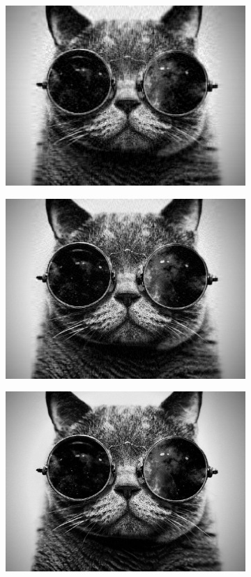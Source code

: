 \begin{figure}[h!]
\vspace{0.4cm}
\begin{subfigure}[c]{.3\textwidth}
\includegraphics[width=.9\linewidth]{images/cat50}
\end{subfigure}
\begin{subfigure}[c]{.3\textwidth}
\includegraphics[width=.9\linewidth]{images/cat100}
\end{subfigure}
\begin{subfigure}[c]{.3\textwidth}
\includegraphics[width=.9\linewidth]{images/cat300}
\end{subfigure}


\end{figure}
